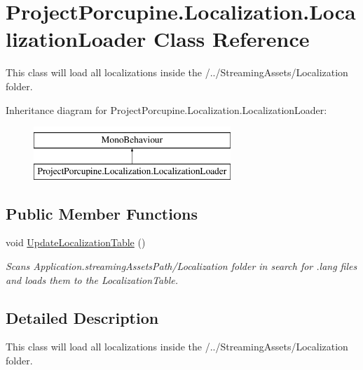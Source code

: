 \hypertarget{class_project_porcupine_1_1_localization_1_1_localization_loader}{}\section{Project\+Porcupine.\+Localization.\+Localization\+Loader Class Reference}
\label{class_project_porcupine_1_1_localization_1_1_localization_loader}


This class will load all localizations inside the /../\+Streaming\+Assets/\+Localization folder.  


Inheritance diagram for Project\+Porcupine.\+Localization.\+Localization\+Loader\+:\begin{figure}[H]
\begin{center}
\leavevmode
\includegraphics[height=2.000000cm]{class_project_porcupine_1_1_localization_1_1_localization_loader}
\end{center}
\end{figure}
\subsection*{Public Member Functions}
\begin{DoxyCompactItemize}
\item 
void \hyperlink{class_project_porcupine_1_1_localization_1_1_localization_loader_a81c620fb63ad11ef3c75024d3245a769}{Update\+Localization\+Table} ()
\begin{DoxyCompactList}\small\item\em Scans Application.\+streaming\+Assets\+Path/\+Localization folder in search for .lang files and load\textquotesingle{}s them to the Localization\+Table. \end{DoxyCompactList}\end{DoxyCompactItemize}


\subsection{Detailed Description}
This class will load all localizations inside the /../\+Streaming\+Assets/\+Localization folder. 

